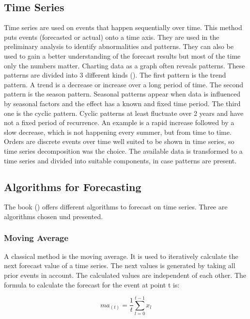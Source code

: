 \subsection{Time Series}\label{subsection:Time Series}
Time series are used on events that happen sequentially over time. This method puts events (forecasted or actual) onto a time axis.
They are used in the preliminary analysis to identify abnormalities and patterns. They can also be used to gain a better understanding of the forecast results but most of the time only the numbers matter. Charting data as a graph often reveals patterns. These patterns are divided into 3 different kinds (\cite{Hyndman.2013}). The first pattern is the trend pattern. A trend is a decrease or increase over a long period of time. The second pattern is the season pattern. Seasonal patterns appear when data is influenced by seasonal factors and the effect has a known and fixed time period. The third one is the cyclic pattern. Cyclic patterns at least fluctuate over 2 years and have not a fixed period of recurrence. An example is a rapid increase followed by a slow decrease, which is not happening every summer, but from time to time.\newline
Orders are discrete events over time well suited to be shown in time series, so time series decomposition was the choice. The available data is transformed to a time series and divided into suitable components, in case patterns are present.
\subsection{Algorithms for Forecasting}\label{subsection:Algorithms for Forecasting}
The book (\cite{Hyndman.2013}) offers different algorithms to forecast on time series. Three are algorithms chosen und presented.
\subsubsection{Moving Average}\label{subsubsection:Moving Average}
A classical method is the moving average. It is used to iteratively calculate the next forecast value of a time series. The next values is generated by taking all prior events in account. The calculated values are independent of each other.\newline
The formula to calculate the forecast for the event at point t is:
\begin{center}
\begin{equation}
ma_{(t)}= \frac{1}{t}\sum^{t-1}_{l = 0} x_{l}
\end{equation}
\end{center}

